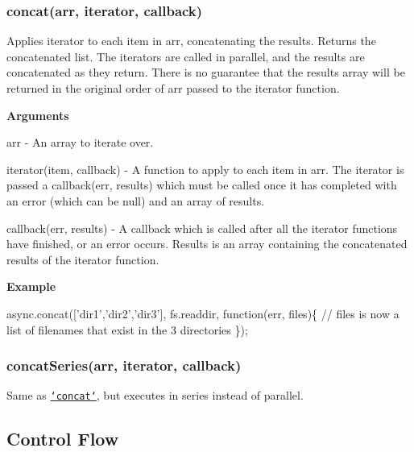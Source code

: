 \label{_concat}%
 \subsubsection*{concat(arr, iterator, callback)}

Applies {\ttfamily iterator} to each item in {\ttfamily arr}, concatenating the results. Returns the concatenated list. The {\ttfamily iterator}s are called in parallel, and the results are concatenated as they return. There is no guarantee that the results array will be returned in the original order of {\ttfamily arr} passed to the {\ttfamily iterator} function.

{\bfseries Arguments}


\begin{DoxyItemize}
\item {\ttfamily arr} -\/ An array to iterate over.
\item {\ttfamily iterator(item, callback)} -\/ A function to apply to each item in {\ttfamily arr}. The iterator is passed a {\ttfamily callback(err, results)} which must be called once it has completed with an error (which can be {\ttfamily null}) and an array of results.
\item {\ttfamily callback(err, results)} -\/ A callback which is called after all the {\ttfamily iterator} functions have finished, or an error occurs. Results is an array containing the concatenated results of the {\ttfamily iterator} function.
\end{DoxyItemize}

{\bfseries Example}


\begin{DoxyCode}
async.concat([\textcolor{stringliteral}{'dir1'},\textcolor{stringliteral}{'dir2'},\textcolor{stringliteral}{'dir3'}], fs.readdir, \textcolor{keyword}{function}(err, files)\{
    \textcolor{comment}{// files is now a list of filenames that exist in the 3 directories}
\});
\end{DoxyCode}
 



\label{_concatSeries}%
 \subsubsection*{concat\+Series(arr, iterator, callback)}

Same as \href{#concat}{\tt `concat`}, but executes in series instead of parallel.

\subsection*{Control Flow}

